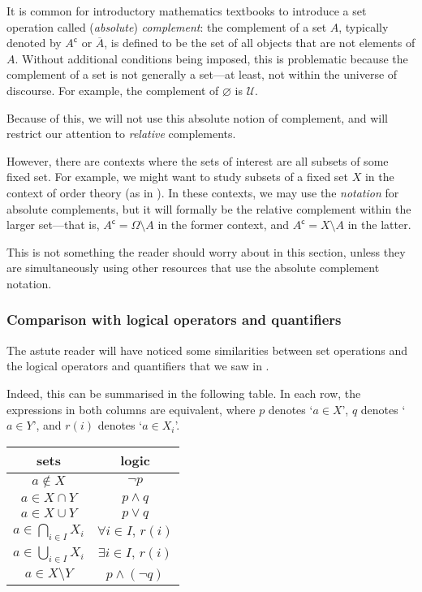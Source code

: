 \begin{aside}
It is common for introductory mathematics textbooks to introduce a set operation called (\textit{absolute}) \textit{complement}: the complement of a set $A$, typically denoted by $A^{\mathsf{c}}$ or $\overline{A}$, is defined to be the set of all objects that are not elements of $A$. Without additional conditions being imposed, this is problematic because the complement of a set is not generally a set---at least, not within the universe of discourse. For example, the complement of $\varnothing$ is $\mathcal{U}$.

Because of this, we will not use this absolute notion of complement, and will restrict our attention to \textit{relative} complements.

However, there are contexts where the sets of interest are all subsets of some fixed set. For example, we might want to study subsets of a fixed set $X$ in the context of order theory (as in ). In these contexts, we may use the \textit{notation} for absolute complements, but it will formally be the relative complement within the larger set---that is, $A^{\mathsf{c}} = \Omega \setminus A$ in the former context, and $A^{\mathsf{c}} = X \setminus A$ in the latter.

This is not something the reader should worry about in this section, unless they are simultaneously using other resources that use the absolute complement notation.
\end{aside}

\subsubsection*{Comparison with logical operators and quantifiers}

The astute reader will have noticed some similarities between set operations and the logical operators and quantifiers that we saw in .

Indeed, this can be summarised in the following table. In each row, the expressions in both columns are equivalent, where $p$ denotes `$a \in X$', $q$ denotes `$a \in Y$', and $r(i)$ denotes `$a \in X_i$'.

\begin{center}\begin{tabular}{c|c}
sets & logic \\ \hline
$a \not\in X$ & $\neg p$ \\
$a \in X \cap Y$ & $p \wedge q$ \\
$a \in X \cup Y$ & $p \vee q$ \\
$a \in \bigcap_{i \in I} X_i$ & $\forall i \in I,\, r(i)$ \\
$a \in \bigcup_{i \in I} X_i$ & $\exists i \in I,\, r(i)$ \\
$a \in X \setminus Y$ & $p \wedge (\neg q)$
\end{tabular}\end{center}

